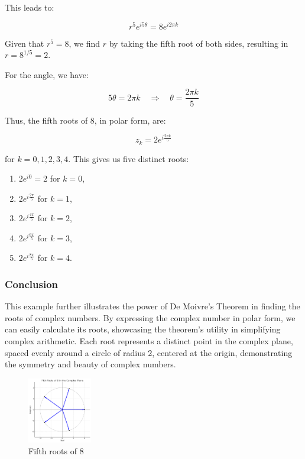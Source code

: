 \documentclass[
]{article}
\providecommand{\tightlist}{%
  \setlength{\itemsep}{0pt}\setlength{\parskip}{0pt}}
\def\tightlist{}
\begin{document}
This leads to:

\[
r^5 e^{i5\theta} = 8e^{i2\pi k}
\]

Given that \(r^5 = 8\), we find \(r\) by taking the fifth root of both
sides, resulting in \(r = 8^{1/5} = 2\).

For the angle, we have:

\[
5\theta = 2\pi k \quad \Rightarrow \quad \theta = \frac{2\pi k}{5}
\]

Thus, the fifth roots of 8, in polar form, are:

\[
z_k = 2e^{i\frac{2\pi k}{5}}
\]

for \(k = 0, 1, 2, 3, 4\). This gives us five distinct roots:

\begin{enumerate}
\def\labelenumi{\arabic{enumi}.}
\tightlist
\item
  \(2e^{i0} = 2\) for \(k=0\),
\item
  \(2e^{i\frac{2\pi}{5}}\) for \(k=1\),
\item
  \(2e^{i\frac{4\pi}{5}}\) for \(k=2\),
\item
  \(2e^{i\frac{6\pi}{5}}\) for \(k=3\),
\item
  \(2e^{i\frac{8\pi}{5}}\) for \(k=4\).
\end{enumerate}

\subsubsection{Conclusion}\label{conclusion-1}

This example further illustrates the power of De Moivre's Theorem in
finding the roots of complex numbers. By expressing the complex number
in polar form, we can easily calculate its roots, showcasing the
theorem's utility in simplifying complex arithmetic. Each root
represents a distinct point in the complex plane, spaced evenly around a
circle of radius 2, centered at the origin, demonstrating the symmetry
and beauty of complex numbers.

\begin{figure}
\centering
\includegraphics[width=0.25\textwidth,height=\textheight]{eight.png}
\caption{Fifth roots of 8}
\end{figure}
\end{document}
